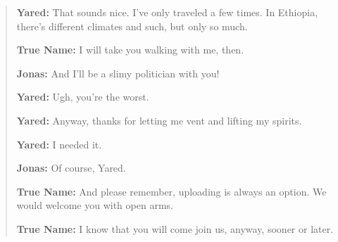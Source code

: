 \begin{quote}
\textbf{Yared:} That sounds nice. I've only traveled a few times. In Ethiopia, there's different climates and such, but only so much.

\textbf{True Name:} I will take you walking with me, then.

\textbf{Jonas:} And I'll be a slimy politician with you!

\textbf{Yared:} Ugh, you're the worst.

\textbf{Yared:} Anyway, thanks for letting me vent and lifting my spirits.

\textbf{Yared:} I needed it.

\textbf{Jonas:} Of course, Yared.

\textbf{True Name:} And please remember, uploading is always an option. We would welcome you with open arms.

\textbf{True Name:} I know that you will come join us, anyway, sooner or later.
\end{quote}

